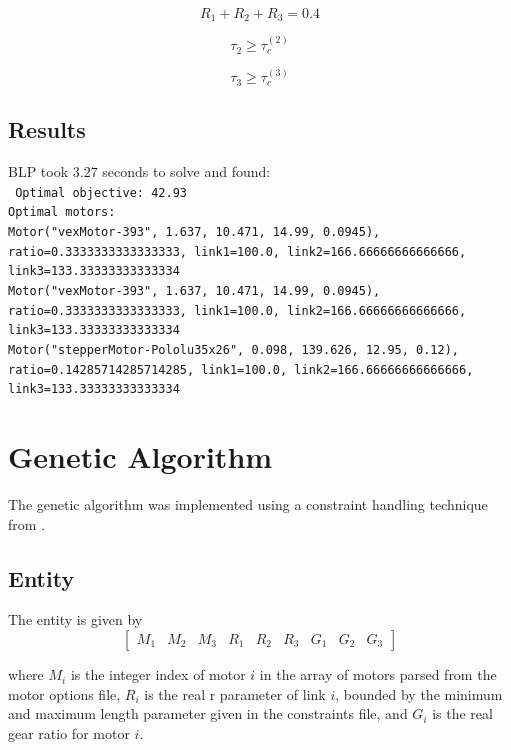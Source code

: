 \documentclass{article}
\begin{document}
\begin{equation}
    R_1 + R_2 + R_3 = 0.4
\end{equation}

\begin{equation}
    \tau_2 \geq \tau_c^{(2)}
\end{equation}

\begin{equation}
    \tau_3 \geq \tau_c^{(3)}
\end{equation}

\FloatBarrier{}
\subsection{Results}

BLP took $3.27$ seconds to solve and found: \\
\texttt{
    Optimal objective: 42.93 \\
    Optimal motors: \\
        Motor("vexMotor-393", 1.637, 10.471, 14.99, 0.0945), ratio=0.3333333333333333, link1=100.0, link2=166.66666666666666, link3=133.33333333333334 \\
        Motor("vexMotor-393", 1.637, 10.471, 14.99, 0.0945), ratio=0.3333333333333333, link1=100.0, link2=166.66666666666666, link3=133.33333333333334 \\
        Motor("stepperMotor-Pololu35x26", 0.098, 139.626, 12.95, 0.12), ratio=0.14285714285714285, link1=100.0, link2=166.66666666666666, link3=133.33333333333334
}

\FloatBarrier{}
\section{Genetic Algorithm}

The genetic algorithm was implemented using a constraint handling technique
from \cite{chehouri2016constraint}.

\FloatBarrier{}
\subsection{Entity}

The entity is given by
\begin{equation}
    \begin{bmatrix}
        M_1 & M_2 & M_3 & R_1 & R_2 & R_3 & G_1 & G_2 & G_3
    \end{bmatrix}
\end{equation}

where $M_i$ is the integer index of motor $i$ in the array of motors parsed
from the motor options file, $R_i$ is the real r parameter of link $i$, bounded
by the minimum and maximum length parameter given in the constraints file, and
$G_i$ is the real gear ratio for motor $i$.
\end{document}
